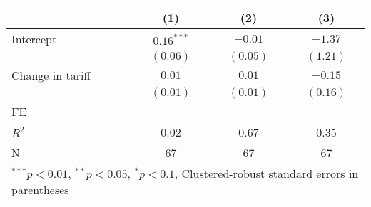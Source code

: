 
\begin{tabular}{l c c c }
\hline
 & (1) & (2) & (3) \\
\hline
Intercept & $0.16^{***}$ & $-0.01$  & $-1.37$  \\
            & $(0.06)$     & $(0.05)$ & $(1.21)$ \\
Change in tariff     & $0.01$       & $0.01$   & $-0.15$  \\
            & $(0.01)$     & $(0.01)$ & $(0.16)$ \\
\hline
FE          &                &                &                \\ 
\hline
$R^2$       & 0.02         & 0.67     & 0.35     \\
N           & 67           & 67       & 67       \\
\hline
\multicolumn{4}{l}{\scriptsize{$^{***}p<0.01$, $^{**}p<0.05$, $^*p<0.1$, Clustered-robust standard errors in parentheses}}
\end{tabular}
